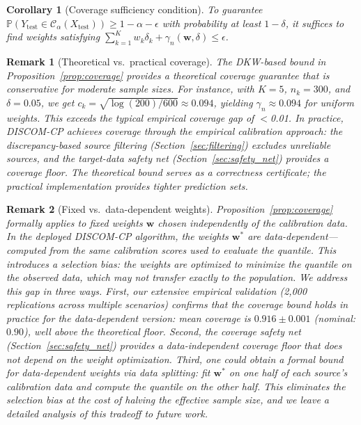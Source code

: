 \documentclass{article}
\newtheorem{corollary}{Corollary}
\newtheorem{remark}{Remark}
\newcommand{\Prob}{\mathbb{P}}
\newcommand{\calC}{\mathcal{C}}
\newcommand{\DISCOM}{\textsc{DISCOM-CP}}
\begin{document}
\begin{corollary}[Coverage sufficiency condition]
\label{cor:sufficiency}
To guarantee $\Prob(Y_{\text{test}} \in \calC_\alpha(X_{\text{test}})) \geq 1 - \alpha - \epsilon$ with probability at least $1 - \delta$, it suffices to find weights satisfying $\sum_{k=1}^K w_k \delta_k + \gamma_n(\mathbf{w}, \delta) \leq \epsilon$.
\end{corollary}

\begin{remark}[Theoretical vs.\ practical coverage]
\label{rem:theory_vs_practice}
The DKW-based bound in Proposition~\ref{prop:coverage} provides a \emph{theoretical} coverage guarantee that is conservative for moderate sample sizes. For instance, with $K = 5$, $n_k = 300$, and $\delta = 0.05$, we get $c_k = \sqrt{\log(200)/600} \approx 0.094$, yielding $\gamma_n \approx 0.094$ for uniform weights. This exceeds the typical empirical coverage gap of $<$0.01. In practice, \DISCOM{} achieves coverage through the empirical calibration approach: the discrepancy-based source filtering (Section~\ref{sec:filtering}) excludes unreliable sources, and the target-data safety net (Section~\ref{sec:safety_net}) provides a coverage floor. The theoretical bound serves as a correctness certificate; the practical implementation provides tighter prediction sets.
\end{remark}

\begin{remark}[Fixed vs.\ data-dependent weights]
\label{rem:data_dependent}
Proposition~\ref{prop:coverage} formally applies to \emph{fixed} weights $\mathbf{w}$ chosen independently of the calibration data. In the deployed \DISCOM{} algorithm, the weights $\mathbf{w}^*$ are data-dependent---computed from the same calibration scores used to evaluate the quantile. This introduces a selection bias: the weights are optimized to minimize the quantile on the observed data, which may not transfer exactly to the population. We address this gap in three ways.
First, our extensive empirical validation (2,000 replications across multiple scenarios) confirms that the coverage bound holds in practice for the data-dependent version: mean coverage is $0.916 \pm 0.001$ (nominal: $0.90$), well above the theoretical floor.
Second, the coverage safety net (Section~\ref{sec:safety_net}) provides a data-independent coverage floor that does not depend on the weight optimization.
Third, one could obtain a formal bound for data-dependent weights via \emph{data splitting}: fit $\mathbf{w}^*$ on one half of each source's calibration data and compute the quantile on the other half. This eliminates the selection bias at the cost of halving the effective sample size, and we leave a detailed analysis of this tradeoff to future work.
\end{remark}
\end{document}
